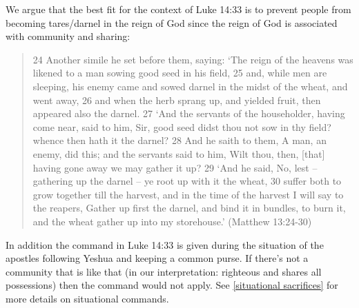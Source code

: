 \documentclass[11pt]{article}
\begin{document}
We argue that the best fit for the context of Luke 14:33 is to prevent people from becoming tares/darnel in the reign of God since the reign of God is associated with community and sharing:
 \begin{quote}
24 Another simile he set before them, saying: `The reign of the heavens was likened to a man sowing good seed in his field,
25 and, while men are sleeping, his enemy came and sowed darnel in the midst of the wheat, and went away,
26 and when the herb sprang up, and yielded fruit, then appeared also the darnel.
27 `And the servants of the householder, having come near, said to him, Sir, good seed didst thou not sow in thy field? whence then hath it the darnel?
28 And he saith to them, A man, an enemy, did this; and the servants said to him, Wilt thou, then, [that] having gone away we may gather it up?
29 `And he said, No, lest -- gathering up the darnel -- ye root up with it the wheat,
30 suffer both to grow together till the harvest, and in the time of the harvest I will say to the reapers, Gather up first the darnel, and bind it in bundles, to burn it, and the wheat gather up into my storehouse.' (Matthew 13:24-30)
 \end{quote}
In addition the command in Luke 14:33 is given during the situation of the apostles following Yeshua and keeping a common purse. If there's not a community that is like that (in our interpretation: righteous and shares all possessions) then the command would not apply. See \ref{situational sacrifices} for more details on situational commands.
\end{document}
